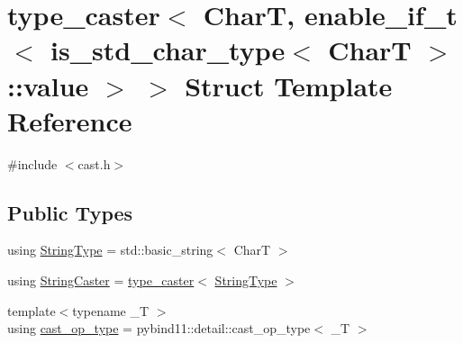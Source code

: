\hypertarget{structtype__caster_3_01_char_t_00_01enable__if__t_3_01is__std__char__type_3_01_char_t_01_4_1_1value_01_4_01_4}{}\section{type\+\_\+caster$<$ CharT, enable\+\_\+if\+\_\+t$<$ is\+\_\+std\+\_\+char\+\_\+type$<$ CharT $>$\+::value $>$ $>$ Struct Template Reference}
\label{structtype__caster_3_01_char_t_00_01enable__if__t_3_01is__std__char__type_3_01_char_t_01_4_1_1value_01_4_01_4}


{\ttfamily \#include $<$cast.\+h$>$}

\subsection*{Public Types}
\begin{DoxyCompactItemize}
\item 
using \mbox{\hyperlink{structtype__caster_3_01_char_t_00_01enable__if__t_3_01is__std__char__type_3_01_char_t_01_4_1_1value_01_4_01_4_a70c19191e1d0747023b2391007be194c}{String\+Type}} = std\+::basic\+\_\+string$<$ CharT $>$
\item 
using \mbox{\hyperlink{structtype__caster_3_01_char_t_00_01enable__if__t_3_01is__std__char__type_3_01_char_t_01_4_1_1value_01_4_01_4_a10a64e7a7ab17aff6f024a8476cc22cc}{String\+Caster}} = \mbox{\hyperlink{classtype__caster}{type\+\_\+caster}}$<$ \mbox{\hyperlink{structtype__caster_3_01_char_t_00_01enable__if__t_3_01is__std__char__type_3_01_char_t_01_4_1_1value_01_4_01_4_a70c19191e1d0747023b2391007be194c}{String\+Type}} $>$
\item 
{\footnotesize template$<$typename \+\_\+T $>$ }\\using \mbox{\hyperlink{structtype__caster_3_01_char_t_00_01enable__if__t_3_01is__std__char__type_3_01_char_t_01_4_1_1value_01_4_01_4_a319a8c4e37e2511027792bed0fc54637}{cast\+\_\+op\+\_\+type}} = pybind11\+::detail\+::cast\+\_\+op\+\_\+type$<$ \+\_\+T $>$
\end{DoxyCompactItemize}
